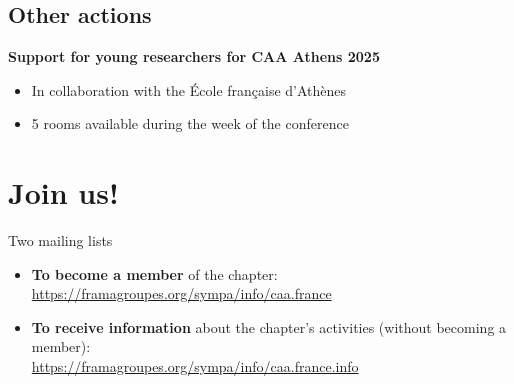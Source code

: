 \documentclass[xcolor=dvipsnames, 10pt, french, american]{beamer}
\begin{document}
\subsection{Other actions}
\frame{\tableofcontents[sectionstyle=show/shaded, subsectionstyle=show/shaded/hide]}
 
 
\begin{frame}
    \begin{block}{\textbf{Support for young researchers for CAA Athens 2025}}
       
        \begin{itemize}
            \item In collaboration with the École française d'Athènes
            \item 5 rooms available during the week of the conference 
        \end{itemize}
    \end{block}
\end{frame}



\section{Join us!}
\frame{\tableofcontents[sectionstyle=show/shaded, subsectionstyle=show/hide/hide]}
 
 
\begin{frame}
	\begin{block}{Two mailing lists}
		\begin{itemize}
			\item \textbf{To become a member} of the chapter: 
                \url{https://framagroupes.org/sympa/info/caa.france}
			\item \textbf{To receive information} about the chapter's activities (without becoming a member):\\ 
                \url{https://framagroupes.org/sympa/info/caa.france.info}
		\end{itemize}
	\end{block}
\end{frame}
\end{document}
